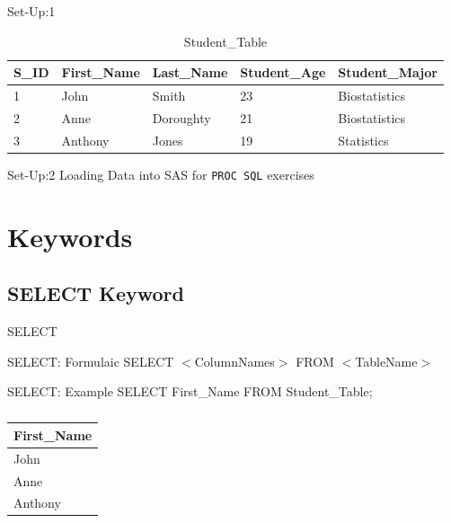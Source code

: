 \documentclass[handout]{beamer}
\begin{document}
	\begin{frame}{Set-Up:1 }
		\begin{minipage}{1 \textwidth}
\begin{table}[H]
	\centering
	\caption{Student\_Table}

	\begin{tabular}{|l|l|l|l|l|}
		\hline
		S\_ID & First\_Name & Last\_Name & Student\_Age & Student\_Major \\ \hline
		1           & John        & Smith      & 23           & Biostatistics  \\ \hline
		2           & Anne        & Doroughty  & 21           & Biostatistics  \\ \hline
		3           & Anthony     & Jones      & 19           & Statistics     \\ \hline
	\end{tabular}
\end{table}	
		\end{minipage}
\end{frame}

\begin{frame}{Set-Up:2}
	Loading Data into SAS for \texttt{PROC SQL} exercises
\end{frame}
	
	\section{Keywords}
	
	\subsection{SELECT Keyword}
	\begin{frame}{SELECT}
		\begin{block}{SELECT: Formulaic}
			SELECT $<$ColumnNames$>$ FROM $<$TableName$>$ 
		\end{block}
		\begin{block}{SELECT: Example}
			SELECT First\_Name FROM Student\_Table;
		\end{block}
\begin{table}[H]
	\centering
	\caption*{}

	\begin{tabular}{|l|}
		\hline
		 First\_Name  \\ \hline
			John \\ \hline
			Anne  \\ \hline
			Anthony  \\    \hline
	\end{tabular}
\end{table}			
	\end{frame}
	
\end{document}
